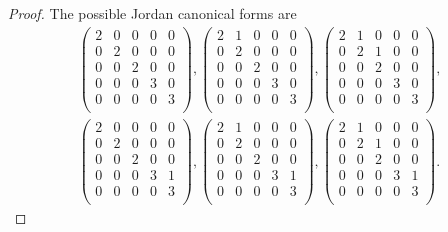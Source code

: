\documentclass{article}
\begin{document}
  \begin{proof}
    The possible Jordan canonical forms are
    \begin{align*}
      \begin{pmatrix} 2&0&0&0&0\\ 0&2&0&0&0\\ 0&0&2&0&0\\ 0&0&0&3&0\\
        0&0&0&0&3\\ \end{pmatrix},
      \begin{pmatrix} 2&1&0&0&0\\ 0&2&0&0&0\\ 0&0&2&0&0\\ 0&0&0&3&0\\
        0&0&0&0&3\\ \end{pmatrix},
      \begin{pmatrix} 2&1&0&0&0\\ 0&2&1&0&0\\ 0&0&2&0&0\\ 0&0&0&3&0\\
        0&0&0&0&3\\ \end{pmatrix},\\
      \begin{pmatrix} 2&0&0&0&0\\ 0&2&0&0&0\\ 0&0&2&0&0\\ 0&0&0&3&1\\
        0&0&0&0&3\\ \end{pmatrix},
      \begin{pmatrix} 2&1&0&0&0\\ 0&2&0&0&0\\ 0&0&2&0&0\\ 0&0&0&3&1\\
        0&0&0&0&3\\ \end{pmatrix},
      \begin{pmatrix} 2&1&0&0&0\\ 0&2&1&0&0\\ 0&0&2&0&0\\ 0&0&0&3&1\\
        0&0&0&0&3\\ \end{pmatrix}.
    \end{align*}
  \end{proof}
\end{document}
